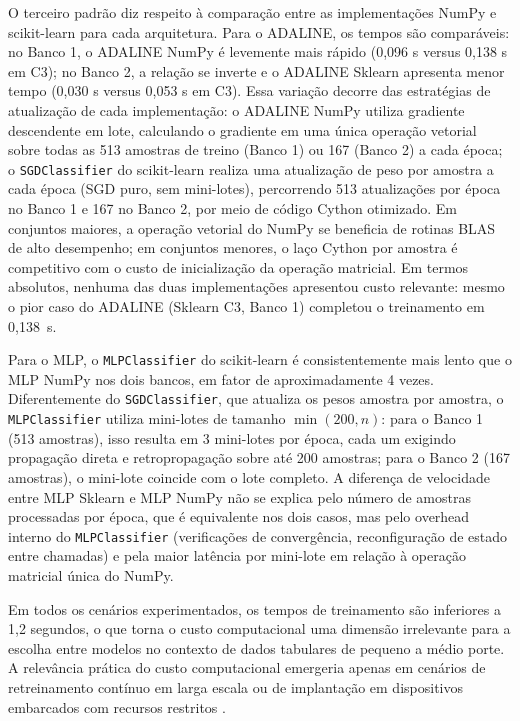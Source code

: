 O terceiro padr\~ao diz respeito \`a compara\c c\~ao entre as implementa\c c\~oes NumPy e
scikit-learn para cada arquitetura. Para o ADALINE, os tempos s\~ao compar\'aveis: no
Banco 1, o ADALINE NumPy \'e levemente mais r\'apido (0,096 s versus 0,138 s em
C3); no Banco 2, a rela\c c\~ao se inverte e o ADALINE Sklearn apresenta menor tempo
(0,030 s versus 0,053 s em C3). Essa varia\c c\~ao decorre das estrat\'egias de atualiza\c c\~ao
de cada implementa\c c\~ao: o ADALINE NumPy utiliza gradiente descendente em lote,
calculando o gradiente em uma \'unica opera\c c\~ao vetorial sobre todas as 513 amostras
de treino (Banco 1) ou 167 (Banco 2) a cada \'epoca; o \texttt{SGDClassifier} do scikit-learn
realiza uma atualiza\c c\~ao de peso por amostra a cada \'epoca (SGD puro, sem mini-lotes),
percorrendo 513 atualiza\c c\~oes por \'epoca no Banco 1 e 167 no Banco 2, por meio de c\'odigo
Cython otimizado. Em conjuntos maiores, a opera\c c\~ao vetorial do NumPy se beneficia de
rotinas BLAS de alto desempenho; em conjuntos menores, o la\c co Cython por amostra
\'e competitivo com o custo de inicializa\c c\~ao da opera\c c\~ao matricial. Em termos absolutos,
nenhuma das duas implementa\c c\~oes apresentou custo relevante: mesmo o pior caso do
ADALINE (Sklearn C3, Banco 1) completou o treinamento em 0,138~s.

Para o MLP, o \texttt{MLPClassifier} do scikit-learn \'e consistentemente mais lento que
o MLP NumPy nos dois bancos, em fator de aproximadamente 4 vezes. Diferentemente
do \texttt{SGDClassifier}, que atualiza os pesos amostra por amostra, o \texttt{MLPClassifier} utiliza
mini-lotes de tamanho $\min(200, n)$: para o Banco 1 (513 amostras), isso resulta em 3
mini-lotes por \'epoca, cada um exigindo propaga\c c\~ao direta e retropropaga\c c\~ao sobre at\'e 200
amostras; para o Banco 2 (167 amostras), o mini-lote coincide com o lote completo. A
diferen\c ca de velocidade entre MLP Sklearn e MLP NumPy n\~ao se explica pelo n\'umero
de amostras processadas por \'epoca, que \'e equivalente nos dois casos, mas pelo overhead
interno do \texttt{MLPClassifier} (verifica\c c\~oes de converg\^encia, reconfigura\c c\~ao de estado entre
chamadas) e pela maior lat\^encia por mini-lote em rela\c c\~ao \`a opera\c c\~ao matricial \'unica do
NumPy.

Em todos os cen\'arios experimentados, os tempos de treinamento s\~ao inferiores a
1,2 segundos, o que torna o custo computacional uma dimens\~ao irrelevante para a escolha
entre modelos no contexto de dados tabulares de pequeno a m\'edio porte. A relev\^ancia
pr\'atica do custo computacional emergeria apenas em cen\'arios de retreinamento cont\'inuo
em larga escala ou de implanta\c c\~ao em dispositivos embarcados com recursos restritos
\cite{dsa2022}.
